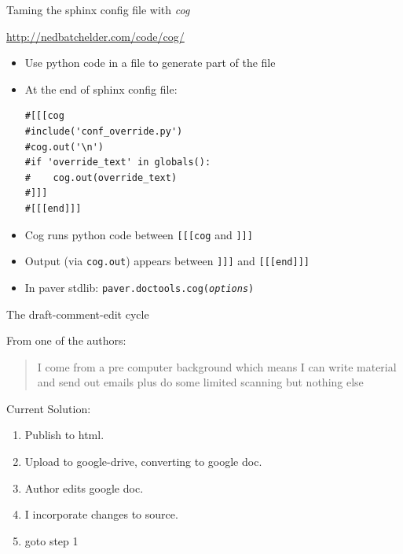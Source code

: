 \documentclass{beamer}
\begin{document}
\begin{frame}[fragile]{Taming the sphinx config file with \emph{cog}}

\url{http://nedbatchelder.com/code/cog/}

\begin{itemize}
\item Use python code in a file to generate part of the file

\item At the end of sphinx config file:
\begin{verbatim}
#[[[cog 
#include('conf_override.py')
#cog.out('\n')
#if 'override_text' in globals():
#    cog.out(override_text)
#]]]
#[[[end]]]
\end{verbatim}

\item Cog runs python code between \texttt{[[[cog} and \texttt{]]]}

\item Output (via \texttt{cog.out}) appears between \texttt{]]]} and \texttt{[[[end]]]}

\item In paver stdlib: \texttt{paver.doctools.cog(\emph{options})}
\end{itemize}
\end{frame}

\begin{frame}[fragile]{The draft-comment-edit cycle}

From one of the authors:

\begin{quote}
I come from a pre computer background which means I can write material and
send out emails plus do some limited scanning but nothing else
\end{quote}


Current Solution:

\begin{enumerate}
\item Publish to html.
\item Upload to google-drive, converting to google doc.
\item Author edits google doc.
\item I incorporate changes to \rst source.
\item goto step 1
\end{enumerate}


\end{frame}
\end{document}
